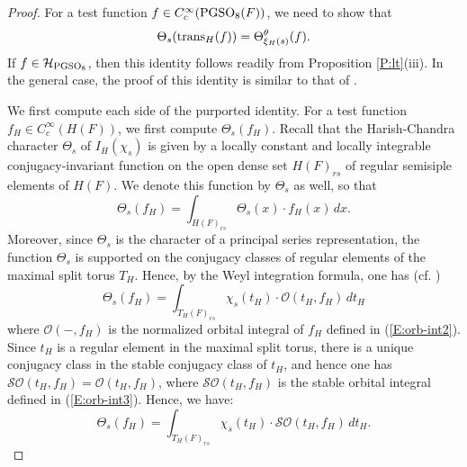 \documentclass[11pt]{amsart}
\theoremstyle{plain}
\numberwithin{equation}{section}
\def\PGSO{{\rm PGSO}}
\begin{document}
\begin{proof}
For a test function $f \in C^{\infty}_c(\PGSO_8(F))$, we need to show that
\[ \Theta_s ({\rm trans}_H(f)) =  \Theta^{\theta}_{\xi_H(s)} (f). \]
If $f \in \mathcal{H}_{\PGSO_8}$, then this identity follows readily from Proposition \ref{P:lt}(iii). In the general case,
the proof of this identity  is similar to  that of \cite[Prop. 6.2]{CG}.  
\vskip 5pt

We first  compute each side of the purported identity.
For a test function $f_H \in C^{\infty}_c(H(F))$, we first compute $\Theta_s(f_H)$. 
Recall that the Harish-Chandra character $\Theta_s$ of $I_H(\chi_s)$ is given by a locally constant and locally integrable conjugacy-invariant function on the open dense set $H(F)_{rs}$ of regular semisiple elements of $H(F)$. We denote this function by $\Theta_s$ as well, so that
\[   \Theta_s(f_H) = \int_{H(F)_{rs}} \Theta_s( x) \cdot f_H(x) \,dx. \]
Moreover, since $\Theta_s$ is the character of a principal series representation, the function $\Theta_s$ is supported on the conjugacy classes of regular elements of the maximal split torus $T_H$.  Hence, by the Weyl integration formula, one has (cf. \cite[\S 5.8]{CG})
\[
   \Theta_s(f_H) =      \int_{T_H(F)_{rs}}    \chi_s(t_H) \cdot  \mathcal{O}( t_H, f_H) \, dt_H \]
where   $\mathcal{O}(- , f_H)$ is the normalized orbital integral of $f_H$ defined in (\ref{E:orb-int2}).
  Since $t_H$ is a regular element in the maximal split torus, there is a unique conjugacy class in the stable conjugacy class of $t_H$, and hence
  one has $\mathcal{SO}(t_H, f_H)  =  \mathcal{O}(t_H, f_H)$, where  $\mathcal{SO}(t_H, f_H)$ is the stable orbital integral defined in (\ref{E:orb-int3}).
 Hence, we have:
\begin{equation} \label{E:trace1}
   \Theta_s(f_H) =   \int_{T_H(F)_{rs}}    \chi_s(t_H) \cdot  \mathcal{SO}( t_H, f_H) \, dt_H. \end{equation}

\vskip 5pt



\end{proof}
\end{document}
